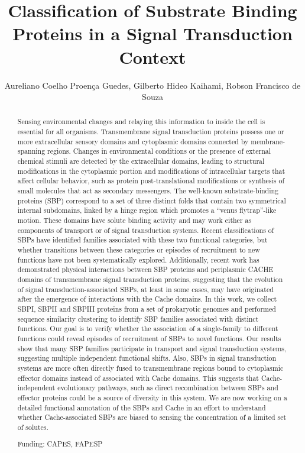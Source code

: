 \documentclass[twoside]{article}
\title{\vspace{-15mm}\fontsize{24pt}{10pt}\selectfont\textbf{ Classification of Substrate Binding Proteins in a Signal Transduction Context }} %
\author{ Aureliano Coelho Proen\c{c}a Guedes, Gilberto Hideo Kaihami, Robson Francisco de Souza }
\affil{  }
\date{}
\begin{document}
  
  
  \maketitle %
  
  
  \thispagestyle{fancy} %
  
  
  \begin{abstract}
  Sensing environmental changes and relaying this information to inside the cell is essential for all organisms. Transmembrane signal transduction proteins possess one or more extracellular sensory domains and cytoplasmic domains connected by membrane-spanning regions. Changes in environmental conditions or the presence of external chemical stimuli are detected by the extracellular domains,  leading to structural modifications in the cytoplasmic portion and modifications of intracellular targets that affect cellular behavior,  such as protein post-translational modifications or synthesis of small molecules that act as secondary messengers. The well-known substrate-binding proteins (SBP) correspond to a set of three distinct folds that contain two symmetrical internal subdomains,  linked by a hinge region which promotes a “venus flytrap”-like motion. These domains have solute binding activity and may work either as components of transport or of signal transduction systems. Recent classifications of SBPs have identified families associated with these two functional categories,  but whether transitions between these categories or episodes of recruitment to new functions have not been systematically explored. Additionally,  recent work has demonstrated physical interactions between SBP proteins and periplasmic CACHE domains of transmembrane signal transduction proteins,  suggesting that the evolution of signal transduction-associated SBPs,  at least in some cases,  may have originated after the emergence of interactions with the Cache domains. In this work,  we collect SBPI,  SBPII and SBPIII proteins from a set of prokaryotic genomes and performed sequence similarity clustering to identify SBP families associated with distinct functions. Our goal is to verify whether the association of a single-family to different functions could reveal episodes of recruitment of SBPs to novel functions. Our results show that many SBP families participate in transport and signal transduction systems,  suggesting multiple independent functional shifts. Also,  SBPs in signal transduction systems are more often directly fused to transmembrane regions bound to cytoplasmic effector domains instead of associated with Cache domains. This suggests that Cache-independent evolutionary pathways,  such as direct recombination between SBPs and effector proteins could be a source of diversity in this system. We are now working on a detailed functional annotation of the SBPs and Cache in an effort to understand whether Cache-associated SBPs are biased to sensing the concentration of a limited set of solutes.
  
  Funding: CAPES,  FAPESP \\ 
  \end{abstract}
  
\end{document}
